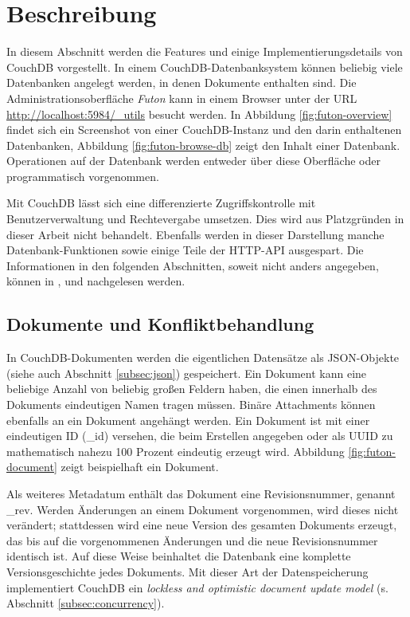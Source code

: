 \section{Beschreibung}
\label{sec:technisch-couchdb}

In diesem Abschnitt werden die Features und einige Implementierungsdetails von CouchDB vorgestellt. In einem CouchDB-Datenbanksystem können beliebig viele Datenbanken angelegt werden, in denen Dokumente enthalten sind. Die Administrationsoberfläche \textit{Futon} kann in einem Browser unter der URL {\url{http://localhost:5984/_utils}} besucht werden. In Abbildung \ref{fig:futon-overview} findet sich ein Screenshot von einer CouchDB-Instanz und den darin enthaltenen Datenbanken, Abbildung \ref{fig:futon-browse-db} zeigt den Inhalt einer Datenbank. Operationen auf der Datenbank werden entweder über diese Oberfläche oder programmatisch vorgenommen.

Mit CouchDB lässt sich eine differenzierte Zugriffskontrolle mit Benutzerverwaltung und Rechtevergabe umsetzen. Dies wird aus Platzgründen in dieser Arbeit nicht behandelt. Ebenfalls werden in dieser Darstellung manche Datenbank-Funktionen sowie einige Teile der HTTP-API ausgespart. Die Informationen in den folgenden Abschnitten, soweit nicht anders angegeben, können in , \cite{couch:overview} und \cite{couchdb:ibm} nachgelesen werden.



\subsection{Dokumente und Konfliktbehandlung}
\label{subsec:dokumente}

In CouchDB-Dokumenten werden die eigentlichen Datensätze als JSON-Objekte (siehe auch Abschnitt \ref{subsec:json}) gespeichert. Ein Dokument kann eine beliebige Anzahl von beliebig großen Feldern haben, die einen innerhalb des Dokuments eindeutigen Namen tragen müssen. Binäre Attachments können ebenfalls an ein Dokument angehängt werden. Ein Dokument ist mit einer eindeutigen ID ({\selectfont \_id}) versehen, die beim Erstellen angegeben oder als UUID zu mathematisch nahezu 100 Prozent eindeutig erzeugt wird. Abbildung \ref{fig:futon-document} zeigt beispielhaft ein Dokument.

Als weiteres Metadatum enthält das Dokument eine Revisionsnummer, genannt {\selectfont \_rev}. Werden Änderungen an einem Dokument vorgenommen, wird dieses nicht verändert; stattdessen wird eine neue Version des gesamten Dokuments erzeugt, das bis auf die vorgenommenen Änderungen und die neue Revisionsnummer identisch ist. Auf diese Weise beinhaltet die Datenbank eine komplette Versionsgeschichte jedes Dokuments. Mit dieser Art der Datenspeicherung implementiert CouchDB ein \textit{lockless and optimistic document update model} (s. Abschnitt \ref{subsec:concurrency}). 

